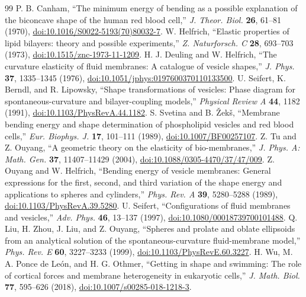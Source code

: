 \documentclass[preprint,amsmath,amssymb,aps,prl,superscriptaddress,nofootinbib,floatfix]{revtex4-2}
\begin{document}
\begin{thebibliography}{99}
 P. B. Canham, ``The minimum energy of bending as a possible explanation of the biconcave shape of the human red blood cell,'' \emph{J. Theor. Biol.} \textbf{26}, 61--81 (1970), \href{https://doi.org/10.1016/S0022-5193(70)80032-7}{doi:10.1016/S0022-5193(70)80032-7}.
 W. Helfrich, ``Elastic properties of lipid bilayers: theory and possible experiments,'' \emph{Z. Naturforsch. C} \textbf{28}, 693--703 (1973), \href{https://doi.org/10.1515/znc-1973-11-1209}{doi:10.1515/znc-1973-11-1209}.
 H. J. Deuling and W. Helfrich, ``The curvature elasticity of fluid membranes: A catalogue of vesicle shapes,'' \emph{J. Phys.} \textbf{37}, 1335--1345 (1976), \href{https://doi.org/10.1051/jphys:0197600370110133500}{doi:10.1051/jphys:0197600370110133500}.
 U. Seifert, K. Berndl, and R. Lipowsky, ``Shape transformations of vesicles: Phase diagram for spontaneous-curvature and bilayer-coupling models,'' \emph{Physical Review A} \textbf{44}, 1182 (1991), \href{https://doi.org/10.1103/PhysRevA.44.1182}{doi:10.1103/PhysRevA.44.1182}.
 S. Svetina and B. \v{Z}ek\v{s}, ``Membrane bending energy and shape determination of phospholipid vesicles and red blood cells,'' \emph{Eur. Biophys. J.} \textbf{17}, 101--111 (1989), \href{https://doi.org/10.1007/BF00257107}{doi:10.1007/BF00257107}.
 Z. Tu and Z. Ouyang, ``A geometric theory on the elasticity of bio-membranes,'' \emph{J. Phys. A: Math. Gen.} \textbf{37}, 11407--11429 (2004), \href{https://doi.org/10.1088/0305-4470/37/47/009}{doi:10.1088/0305-4470/37/47/009}.
 Z. Ouyang and W. Helfrich, ``Bending energy of vesicle membranes: General expressions for the first, second, and third variation of the shape energy and applications to spheres and cylinders,'' \emph{Phys. Rev. A} \textbf{39}, 5280--5288 (1989), \href{https://doi.org/10.1103/PhysRevA.39.5280}{doi:10.1103/PhysRevA.39.5280}.
 U. Seifert, ``Configurations of fluid membranes and vesicles,'' \emph{Adv. Phys.} \textbf{46}, 13--137 (1997), \href{https://doi.org/10.1080/00018739700101488}{doi:10.1080/00018739700101488}.
 Q. Liu, H. Zhou, J. Liu, and Z. Ouyang, ``Spheres and prolate and oblate ellipsoids from an analytical solution of the spontaneous-curvature fluid-membrane model,'' \emph{Phys. Rev. E} \textbf{60}, 3227--3233 (1999), \href{https://doi.org/10.1103/PhysRevE.60.3227}{doi:10.1103/PhysRevE.60.3227}.
 H. Wu, M. A. Ponce de Le\'{o}n, and H. G. Othmer, ``Getting in shape and swimming: The role of cortical forces and membrane heterogeneity in eukaryotic cells,'' \emph{J. Math. Biol.} \textbf{77}, 595--626 (2018), \href{https://doi.org/10.1007/s00285-018-1218-3}{doi:10.1007/s00285-018-1218-3}.

\end{thebibliography}
\end{document}
